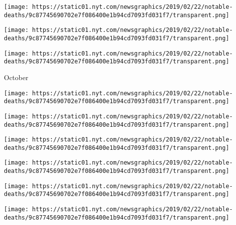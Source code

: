 \href{https://www.nytimes.com/2019/11/03/world/americas/walter-mercado-dead.html}{}

\texttt{[image: https://static01.nyt.com/newsgraphics/2019/02/22/notable-deaths/9c87745690702e7f086400e1b94cd7093fd031f7/transparent.png]}

\href{https://www.nytimes.com/2019/11/03/arts/television/brian-tarantina-dead.html}{}

\texttt{[image: https://static01.nyt.com/newsgraphics/2019/02/22/notable-deaths/9c87745690702e7f086400e1b94cd7093fd031f7/transparent.png]}

\href{https://www.nytimes.com/2019/11/01/world/azam-taleghani-dead.html}{}

\texttt{[image: https://static01.nyt.com/newsgraphics/2019/02/22/notable-deaths/9c87745690702e7f086400e1b94cd7093fd031f7/transparent.png]}

October

\href{https://www.nytimes.com/2019/10/31/sports/baseball/ron-fairly-dead.html}{}

\texttt{[image: https://static01.nyt.com/newsgraphics/2019/02/22/notable-deaths/9c87745690702e7f086400e1b94cd7093fd031f7/transparent.png]}

\href{https://www.nytimes.com/2019/10/30/arts/music/rolando-panerai-dead.html}{}

\texttt{[image: https://static01.nyt.com/newsgraphics/2019/02/22/notable-deaths/9c87745690702e7f086400e1b94cd7093fd031f7/transparent.png]}

\href{https://www.nytimes.com/2019/10/30/movies/john-witherspoon-dead.html}{}

\texttt{[image: https://static01.nyt.com/newsgraphics/2019/02/22/notable-deaths/9c87745690702e7f086400e1b94cd7093fd031f7/transparent.png]}

\href{https://www.nytimes.com/2019/10/29/sports/basketball/al-bianchi-dead.html}{}

\texttt{[image: https://static01.nyt.com/newsgraphics/2019/02/22/notable-deaths/9c87745690702e7f086400e1b94cd7093fd031f7/transparent.png]}

\href{https://www.nytimes.com/2019/10/28/arts/robert-evans-dead.html}{}

\texttt{[image: https://static01.nyt.com/newsgraphics/2019/02/22/notable-deaths/9c87745690702e7f086400e1b94cd7093fd031f7/transparent.png]}

\href{https://www.nytimes.com/2019/10/28/us/politics/kay-hagan-dead.html}{}

\texttt{[image: https://static01.nyt.com/newsgraphics/2019/02/22/notable-deaths/9c87745690702e7f086400e1b94cd7093fd031f7/transparent.png]}

